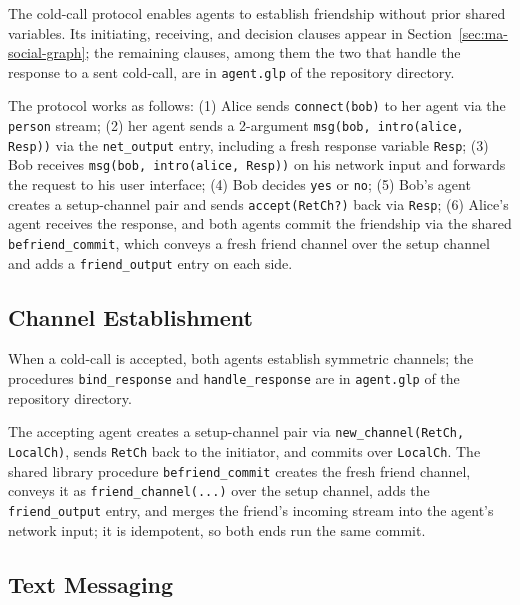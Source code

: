 The cold-call protocol enables agents to establish friendship without prior shared variables. Its initiating, receiving, and decision clauses appear in Section~\ref{sec:ma-social-graph}; the remaining clauses, among them the two that handle the response to a sent cold-call, are in \verb|agent.glp| of the repository directory.

The protocol works as follows: (1) Alice sends \verb|connect(bob)| to her agent via the \verb|person| stream; (2) her agent sends a 2-argument \verb|msg(bob, intro(alice, Resp))| via the \verb|net_output| entry, including a fresh response variable \verb|Resp|; (3) Bob receives \verb|msg(bob, intro(alice, Resp))| on his network input and forwards the request to his user interface; (4) Bob decides \verb|yes| or \verb|no|; (5) Bob's agent creates a setup-channel pair and sends \verb|accept(RetCh?)| back via \verb|Resp|; (6) Alice's agent receives the response, and both agents commit the friendship via the shared \verb|befriend_commit|, which conveys a fresh friend channel over the setup channel and adds a \verb|friend_output| entry on each side.

\subsection{Channel Establishment}

When a cold-call is accepted, both agents establish symmetric channels; the procedures \verb|bind_response| and \verb|handle_response| are in \verb|agent.glp| of the repository directory.

The accepting agent creates a setup-channel pair via \verb|new_channel(RetCh, LocalCh)|, sends \verb|RetCh| back to the initiator, and commits over \verb|LocalCh|. The shared library procedure \verb|befriend_commit| creates the fresh friend channel, conveys it as \verb|friend_channel(...)| over the setup channel, adds the \verb|friend_output| entry, and merges the friend's incoming stream into the agent's network input; it is idempotent, so both ends run the same commit.

\subsection{Text Messaging}

